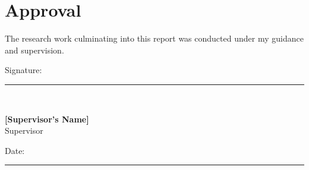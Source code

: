 \chapter*{Approval}


\vspace{1mm}

\par\vspace{1mm}
The research work culminating into this report was conducted under my guidance and supervision.


\vspace{5mm}

Signature:  \rule{50mm}{0.5pt}\\
\par\vspace{10mm}
\textbf{[Supervisor's Name]}\\
Supervisor
\par\vspace{10mm}
Date: \rule{50mm}{0.5pt}\\
